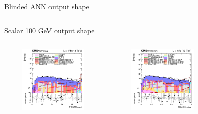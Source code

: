 \documentclass[8pt]{beamer}
\begin{document}
\begin{frame}{Blinded ANN output shape}
\begin{columns}
\begin{column}{1.09\textwidth}
\begin{block}{\centering Scalar 100 GeV output shape}\end{block}
\end{column}
\end{columns} \vspace{-5pt}

\begin{columns}
		\begin{column}{0.33\textwidth}
			\begin{center}
			\vspace{-8pt}
			\begin{block}{}\end{block}
     			\includegraphics[width=1.0\textwidth, height=90pt]{figs/2016/log_cratio_topCR_ll_var_DNN_signal0_scalar100.png}
    		\end{center}		
		\end{column} 
		\begin{column}{0.33\textwidth}
			\begin{center}
			\vspace{-8pt}
			\begin{block}{}\end{block}
     			\includegraphics[width=1.0\textwidth, height=90pt]{figs/2017/log_cratio_topCR_ll_var_DNN_signal0_scalar100.png}
    		\end{center}		
		\end{column} 
		\begin{column}{0.33\textwidth}
			\begin{center}
			\vspace{-8pt}
			\begin{block}{}\end{block}

\end{center}
\end{column}
\end{columns}
\end{frame}
\end{document}
